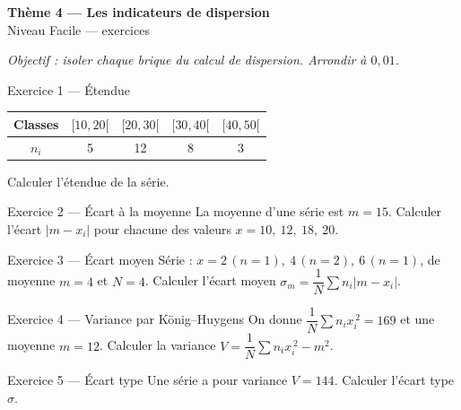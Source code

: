 \documentclass[11pt,a4paper]{article}
\newcommand{\bandeau}[2]{%
\begin{tcolorbox}[boxbase,colback=primary,colframe=primarydark,halign=center,
   before skip=2pt,after skip=12pt]
{\LARGE\bfseries\color{white} #1}\\[3pt]{\normalsize\color{white} #2}
\end{tcolorbox}}
\newcommand{\ecm}{\sigma_m}
\newcommand{\ect}{\sigma}
\begin{document}
\bandeau{Thème 4 — Les indicateurs de dispersion}{Niveau Facile — exercices}

\noindent\textit{Objectif : isoler chaque brique du calcul de dispersion. Arrondir à $0{,}01$.}\medskip

\begin{exobox}{Exercice 1 — Étendue}
\begin{center}
\begin{tabular}{|c|c|c|c|c|}
\hline
Classes & $[10,20[$ & $[20,30[$ & $[30,40[$ & $[40,50[$ \\\hline
$n_i$ & 5 & 12 & 8 & 3 \\\hline
\end{tabular}
\end{center}
Calculer l'étendue de la série.
\end{exobox}

\begin{exobox}{Exercice 2 — Écart à la moyenne}
La moyenne d'une série est $m=15$. Calculer l'écart $|m-x_i|$ pour chacune des valeurs
$x=10,\ 12,\ 18,\ 20$.
\end{exobox}

\begin{exobox}{Exercice 3 — Écart moyen}
Série : $x=2\,(n{=}1),\ 4\,(n{=}2),\ 6\,(n{=}1)$, de moyenne $m=4$ et $N=4$.
Calculer l'écart moyen $\ecm=\dfrac{1}{N}\sum n_i|m-x_i|$.
\end{exobox}

\begin{exobox}{Exercice 4 — Variance par König--Huygens}
On donne $\dfrac{1}{N}\sum n_i x_i^{\,2}=169$ et une moyenne $m=12$.
Calculer la variance $V=\dfrac{1}{N}\sum n_i x_i^{\,2}-m^2$.
\end{exobox}

\begin{exobox}{Exercice 5 — Écart type}
Une série a pour variance $V=144$. Calculer l'écart type $\ect$.
\end{exobox}
\end{document}
